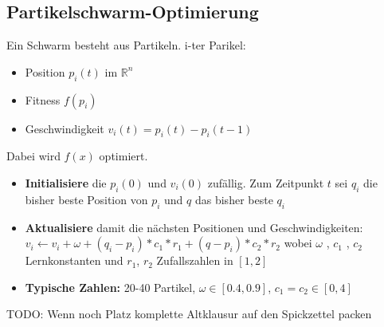 \subsection{Partikelschwarm-Optimierung}
Ein Schwarm besteht aus Partikeln. i-ter Parikel: \begin{itemize}
	\item	Position $p_i(t)$ im $\mathbb{R}^n$
	\item	Fitness $f(p_i)$
	\item	Geschwindigkeit $v_i(t)=p_i(t)-p_i(t-1)$
\end{itemize} Dabei wird $f(x)$ optimiert.
\begin{itemize}
	\item	\textbf{Initialisiere} die $p_i(0)$ und $v_i(0)$ zufällig. Zum Zeitpunkt $t$ sei $q_i$ die bisher beste Position von $p_i$ und $q$ das bisher beste $q_i$
	\item	\textbf{Aktualisiere} damit die nächsten Positionen und Geschwindigkeiten: $v_i \leftarrow v_i + \omega + (q_i - p_i)*c_1 * r_1 + (q - p_i)*c_2 *r_2$ 
	wobei $\omega$ ,
	 $c_1$ , $c_2$
	  Lernkonstanten und $r_1$, $r_2$ Zufallszahlen in $[1,2]$
	\item	\textbf{Typische Zahlen:} 20-40 Partikel, $\omega \in [0.4,0.9]$, $c_1=c_2 \in [0,4]$

\end{itemize}

TODO: Wenn noch Platz komplette Altklausur auf den Spickzettel packen
